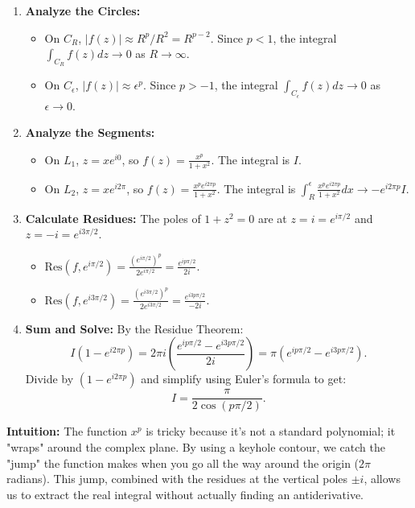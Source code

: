 \begin{solution}
\begin{enumerate}
    \item \textbf{Analyze the Circles:} 
    \begin{itemize}
        \item On $C_R$, $|f(z)| \approx R^p/R^2 = R^{p-2}$. Since $p < 1$, the integral $\int_{C_R} f(z)dz \to 0$ as $R \to \infty$.
        \item On $C_\epsilon$, $|f(z)| \approx \epsilon^p$. Since $p > -1$, the integral $\int_{C_\epsilon} f(z)dz \to 0$ as $\epsilon \to 0$.
    \end{itemize}

    \item \textbf{Analyze the Segments:} 
    \begin{itemize}
        \item On $L_1$, $z = x e^{i0}$, so $f(z) = \frac{x^p}{1+x^2}$. The integral is $I$.
        \item On $L_2$, $z = x e^{i2\pi}$, so $f(z) = \frac{x^p e^{i2\pi p}}{1+x^2}$. The integral is $\int_R^\epsilon \frac{x^p e^{i2\pi p}}{1+x^2} dx \to -e^{i2\pi p} I$.
    \end{itemize}

    \item \textbf{Calculate Residues:} The poles of $1+z^2=0$ are at $z = i = e^{i\pi/2}$ and $z = -i = e^{i3\pi/2}$.
    \begin{itemize}
        \item $\text{Res}(f, e^{i\pi/2}) = \frac{(e^{i\pi/2})^p}{2e^{i\pi/2}} = \frac{e^{ip\pi/2}}{2i}$.
        \item $\text{Res}(f, e^{i3\pi/2}) = \frac{(e^{i3\pi/2})^p}{2e^{i3\pi/2}} = \frac{e^{i3p\pi/2}}{-2i}$.
    \end{itemize}

    \item \textbf{Sum and Solve:} By the Residue Theorem:
    \[ I(1 - e^{i2\pi p}) = 2\pi i \left( \frac{e^{ip\pi/2} - e^{i3p\pi/2}}{2i} \right) = \pi (e^{ip\pi/2} - e^{i3p\pi/2}). \]
    Divide by $(1 - e^{i2\pi p})$ and simplify using Euler's formula to get:
    \[ I = \frac{\pi}{2\cos(p\pi/2)}. \]
\end{enumerate}

\bigskip

\textbf{Intuition:} 
The function $x^p$ is tricky because it's not a standard polynomial; it "wraps" around the complex plane. By using a keyhole contour, we catch the "jump" the function makes when you go all the way around the origin ($2\pi$ radians). This jump, combined with the residues at the vertical poles $\pm i$, allows us to extract the real integral without actually finding an antiderivative.
\end{solution}


